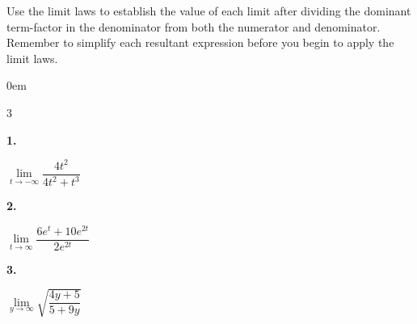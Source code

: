 \documentclass[12pt,]{book}
\theoremstyle{plain}
\theoremstyle{definition}
\numberwithin{equation}{section}
\newenvironment{exercisegroup}%
{\medskip\noindent}%
{\par\bigskip}%
\newlength{\exercisegroupindent}%
\newlength{\exercisegroupitemwidth}%
\newenvironment{exercisegrouplist}%
{\vspace{-\partopsep}%
\begin{adjustwidth}{\exercisegroupindent}{0em}}%
{\end{adjustwidth}%
\vspace{-\partopsep}%
\vspace{\baselineskip}}%
\newenvironment{exercisegroupbycol}[1]%
{\begin{exercisegrouplist}%
\vspace{-\multicolsep}%
\begin{multicols}{#1}%
\setlength{\parindent}{0em}%
\setlength{\exercisegroupitemwidth}{\linewidth}}%
{\end{multicols}%
\vspace{-\multicolsep}%
\end{exercisegrouplist}}%
\newenvironment{exercisegroupitem}[1]%
{\begin{minipage}[t]{\exercisegroupitemwidth}
\vspace{0pt}%
{\bfseries#1}%
\rule{0pt}{\baselineskip}}{\strut%
\end{minipage}%
\hspace{\columnsep}}%
\providecommand\phantomsection{}
\begin{document}
\begin{exercisegroup}%
Use the limit laws to establish the value of each limit after dividing the dominant term-factor in the denominator from both the numerator and denominator. Remember to simplify each resultant expression before you begin to apply the limit laws.%
\begin{exercisegroupbycol}{3}%
\begin{exercisegroupitem}{1. }\phantomsection\hypertarget{exercise-70}{\null}
\(\lim\limits_{t\to-\infty}\dfrac{4t^2}{4t^2+t^3}\)%
\end{exercisegroupitem}%
\par%
\begin{exercisegroupitem}{2. }\phantomsection\hypertarget{exercise-71}{\null}
\(\lim\limits_{t\to\infty}\dfrac{6e^t+10e^{2t}}{2e^{2t}}\)%
\end{exercisegroupitem}%
\par%
\begin{exercisegroupitem}{3. }\phantomsection\hypertarget{exercise-72}{\null}
\(\lim\limits_{y\to\infty}\sqrt{\dfrac{4y+5}{5+9y}}\)%
\end{exercisegroupitem}%
\par%
\end{exercisegroupbycol}%
\end{exercisegroup}%
\typeout{************************************************}
\typeout{************************************************}
\end{document}
